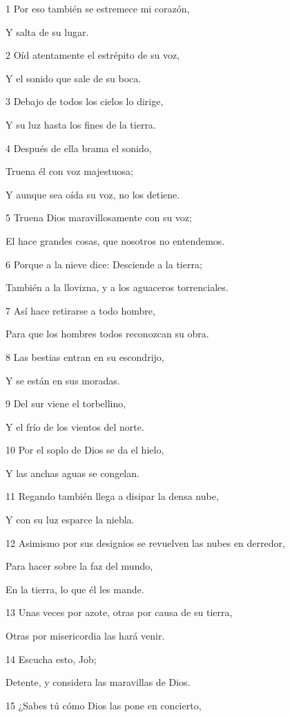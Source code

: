 \par 1 Por eso también se estremece mi corazón,
\par Y salta de su lugar.
\par 2 Oíd atentamente el estrépito de su voz,
\par Y el sonido que sale de su boca.
\par 3 Debajo de todos los cielos lo dirige,
\par Y su luz hasta los fines de la tierra.
\par 4 Después de ella brama el sonido,
\par Truena él con voz majestuosa;
\par Y aunque sea oída su voz, no los detiene.
\par 5 Truena Dios maravillosamente con su voz;
\par El hace grandes cosas, que nosotros no entendemos.
\par 6 Porque a la nieve dice: Desciende a la tierra;
\par También a la llovizna, y a los aguaceros torrenciales.
\par 7 Así hace retirarse a todo hombre,
\par Para que los hombres todos reconozcan su obra.
\par 8 Las bestias entran en su escondrijo,
\par Y se están en sus moradas.
\par 9 Del sur viene el torbellino,
\par Y el frío de los vientos del norte.
\par 10 Por el soplo de Dios se da el hielo,
\par Y las anchas aguas se congelan.
\par 11 Regando también llega a disipar la densa nube,
\par Y con su luz esparce la niebla.
\par 12 Asimismo por sus designios se revuelven las nubes en derredor,
\par Para hacer sobre la faz del mundo,
\par En la tierra, lo que él les mande.
\par 13 Unas veces por azote, otras por causa de su tierra,
\par Otras por misericordia las hará venir.
\par 14 Escucha esto, Job;
\par Detente, y considera las maravillas de Dios.
\par 15 ¿Sabes tú cómo Dios las pone en concierto,
